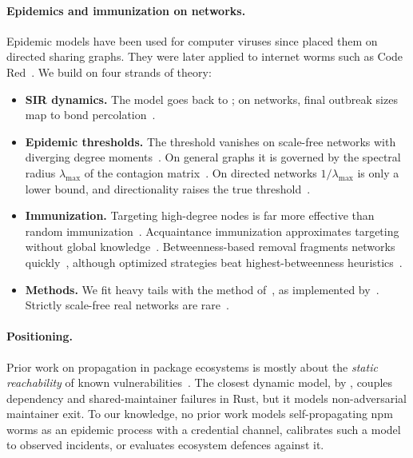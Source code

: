 \paragraph{Epidemics and immunization on networks.}
Epidemic models have been used for computer viruses since \citet{kephart1991directed} placed them on
directed sharing graphs. They were later applied to internet worms such as Code Red~\citep{zou2002codered}.
We build on four strands of theory:
\begin{itemize}
  \item \textbf{SIR dynamics.} The model goes back to \citet{kermack1927contribution}; on networks,
        final outbreak sizes map to bond percolation~\citep{newman2002spread}.
  \item \textbf{Epidemic thresholds.} The threshold vanishes on scale-free networks with diverging
        degree moments~\citep{pastorsatorras2001epidemic,pastorsatorras2015review}. On general graphs it
        is governed by the spectral radius $\lambda_{\max}$ of the contagion
        matrix~\citep{wang2003eigenvalue,chakrabarti2008thresholds}. On directed networks $1/\lambda_{\max}$
        is only a lower bound, and directionality raises the true
        threshold~\citep{li2013directed,boguna2005directed}.
  \item \textbf{Immunization.} Targeting high-degree nodes is far more effective than random
        immunization~\citep{pastorsatorras2002immunization}. Acquaintance immunization approximates
        targeting without global knowledge~\citep{cohen2003acquaintance}. Betweenness-based removal
        fragments networks quickly~\citep{holme2002attack,freeman1977betweenness}, although optimized
        strategies beat highest-betweenness heuristics~\citep{schneider2011limited,chen2008immunization}.
  \item \textbf{Methods.} We fit heavy tails with the method of~\citet{clauset2009powerlaw}, as
        implemented by~\citet{alstott2014powerlaw}. Strictly scale-free real networks are
        rare~\citep{broido2019rare}.
\end{itemize}

\paragraph{Positioning.}
Prior work on propagation in package ecosystems is mostly about the \emph{static reachability} of known
vulnerabilities~\citep{decan2018vulnerabilities,liu2022demystifying,zerouali2022vulnerabilities,
mir2023maven,robinson2026originalsin}. The closest dynamic model, by \citet{schueller2024risks}, couples
dependency and shared-maintainer failures in Rust, but it models non-adversarial maintainer exit. To our
knowledge, no prior work models self-propagating npm worms as an epidemic process with a credential
channel, calibrates such a model to observed incidents, or evaluates ecosystem defences against it.
